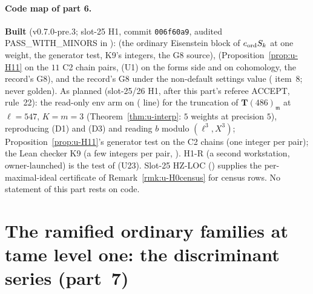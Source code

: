 \documentclass[11pt]{article}
\newcommand{\Tu}{\mathbf{T}}                      %
\begin{document}
\paragraph{Code map of part 6.} \textbf{Built} (v0.7.0-pre.3; slot-25 H1, commit \texttt{006f60a9}, audited PASS\_WITH\_MINORS in ):
 (the ordinary Eisenstein block of $e_{\mathrm{ord}} S_k$ at one weight, the generator test, K9's integers, the G8 source),
 (Proposition~\ref{prop:u-H11} on the $11$ C2 chain pairs, (U1) on the forms side and on cohomology, the record's G8), and the record's G8 under the
non-default settings value  ( item~8; never golden). As planned (slot-25/26 H1, after this part's referee ACCEPT, rule~22): the read-only env arm  on
 ( line) for the truncation of $\Tu(486)_{\mathfrak m}$ at $\ell=547$, $K=m=3$ (Theorem~\ref{thm:u-interp}: $5$ weights at precision $5$),
reproducing (D1) and (D3) and reading $b$ modulo $(\ell^{3},X^{3})$; Proposition~\ref{prop:u-H11}'s generator test on the C2 chains (one integer per pair); the Lean checker K9 (a few integers
per pair, ). H1-R (a second workstation, owner-launched) is the test of (U23). Slot-25 HZ-LOC () supplies the per-maximal-ideal certificate of
Remark~\ref{rmk:u-H0census} for census rows. No statement of this part rests on code.

\section{The ramified ordinary families at tame level one: the discriminant series (part~7)}\label{sec:u-H2}
\end{document}
